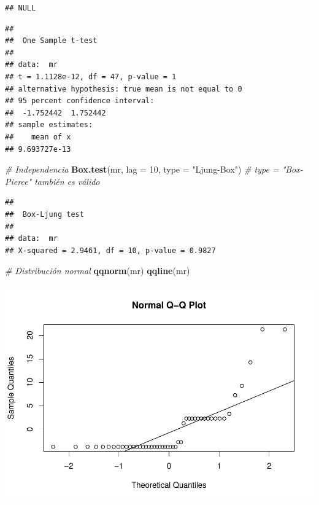 \documentclass[
]{book}
\newenvironment{Shaded}{\begin{snugshade}}{\end{snugshade}}
\newcommand{\AttributeTok}[1]{\textcolor[rgb]{0.13,0.29,0.53}{#1}}
\newcommand{\CommentTok}[1]{\textcolor[rgb]{0.56,0.35,0.01}{\textit{#1}}}
\newcommand{\DecValTok}[1]{\textcolor[rgb]{0.00,0.00,0.81}{#1}}
\newcommand{\FunctionTok}[1]{\textcolor[rgb]{0.13,0.29,0.53}{\textbf{#1}}}
\newcommand{\NormalTok}[1]{#1}
\newcommand{\OtherTok}[1]{\textcolor[rgb]{0.56,0.35,0.01}{#1}}
\newcommand{\SpecialCharTok}[1]{\textcolor[rgb]{0.81,0.36,0.00}{\textbf{#1}}}
\newcommand{\StringTok}[1]{\textcolor[rgb]{0.31,0.60,0.02}{#1}}
\begin{document}
\begin{verbatim}
## NULL
\end{verbatim}

\begin{Shaded}
\end{Shaded}

\begin{verbatim}
## 
##  One Sample t-test
## 
## data:  mr
## t = 1.1128e-12, df = 47, p-value = 1
## alternative hypothesis: true mean is not equal to 0
## 95 percent confidence interval:
##  -1.752442  1.752442
## sample estimates:
##    mean of x 
## 9.693727e-13
\end{verbatim}

\begin{Shaded}
\begin{Highlighting}[]
\CommentTok{\# Independencia}
\FunctionTok{Box.test}\NormalTok{(mr, }\AttributeTok{lag =} \DecValTok{10}\NormalTok{, }\AttributeTok{type =} \StringTok{"Ljung{-}Box"}\NormalTok{) }\CommentTok{\#  type = "Box{-}Pierce" también es válido}
\end{Highlighting}
\end{Shaded}

\begin{verbatim}
## 
##  Box-Ljung test
## 
## data:  mr
## X-squared = 2.9461, df = 10, p-value = 0.9827
\end{verbatim}

\begin{Shaded}
\begin{Highlighting}[]
\CommentTok{\# Distribución normal}
\FunctionTok{qqnorm}\NormalTok{(mr)}
\FunctionTok{qqline}\NormalTok{(mr)}
\end{Highlighting}
\end{Shaded}

\includegraphics{_main_files/figure-latex/unnamed-chunk-21-1.pdf}
\end{document}
